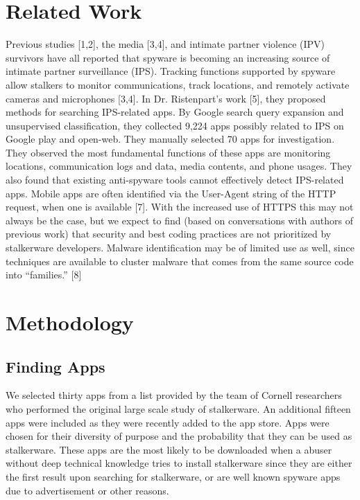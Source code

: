 \documentclass[acmtog]{acmart}
\begin{document}
\section{Related Work}
Previous studies [1,2], the media [3,4], and intimate partner violence (IPV) 
survivors have all reported that spyware is becoming an increasing source of 
intimate partner surveillance (IPS). Tracking functions supported by spyware 
allow stalkers to monitor communications, track locations, and remotely 
activate cameras and microphones [3,4]. In Dr. Ristenpart’s work [5], they 
proposed methods for searching IPS-related apps. By Google search query 
expansion and unsupervised classification, they collected 9,224 apps possibly 
related to IPS on Google play and open-web. They manually selected 70 apps for 
investigation. They observed the most fundamental functions of these apps are 
monitoring locations, communication logs and data, media contents, and phone 
usages. They also found that existing anti-spyware tools cannot effectively 
detect IPS-related apps.
Mobile apps are often identified via the User-Agent string of the HTTP request, 
when one is available [7]. With the increased use of HTTPS this may not always 
be the case, but we expect to find (based on conversations with authors of 
previous work) that security and best coding practices are not prioritized by 
stalkerware developers. Malware identification may be of limited use as well, 
since techniques are available to cluster malware that comes from the same 
source code into “families.” [8]

\section{Methodology}
\subsection{Finding Apps}
We selected thirty apps from a list provided by the team of Cornell researchers 
who performed the original large scale study of stalkerware\cite{chatterjee_spyware_2018}. An 
additional fifteen apps were included as they were recently added to the app 
store. Apps were chosen for their diversity of purpose and the probability that 
they can be used as stalkerware. These apps are the most likely to be 
downloaded when a abuser without deep technical knowledge tries to install 
stalkerware since they are either the first result upon searching for stalkerware, or are well known spyware apps due to advertisement or other reasons. 
\end{document}
